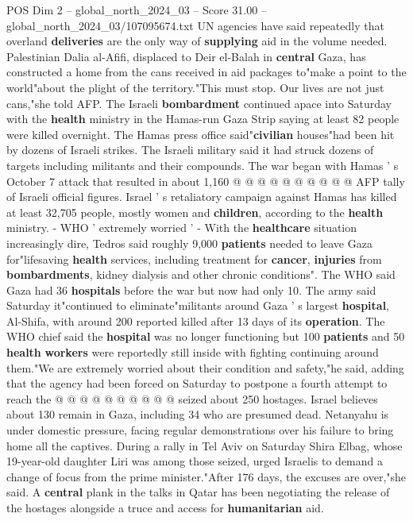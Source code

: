 \begin{textsample}{POS Dim 2 – global\_north\_2024\_03 – Score 31.00 – global\_north\_2024\_03/107095674.txt}
UN agencies have said repeatedly that overland \textbf{deliveries} are the only way of \textbf{supplying} aid in the volume needed.
Palestinian Dalia al-Afifi, displaced to Deir el-Balah in \textbf{central} Gaza, has constructed a home from the cans received in aid packages to"make a point to the world"about the plight of the territory."This must stop.
Our lives are not just cans,"she told AFP.
The Israeli \textbf{bombardment} continued apace into Saturday with the \textbf{health} ministry in the Hamas-run Gaza Strip saying at least 82 people were killed overnight.
The Hamas press office said"\textbf{civilian} houses"had been hit by dozens of Israeli strikes.
The Israeli military said it had struck dozens of targets including militants and their compounds.
The war began with Hamas ' s October 7 attack that resulted in about 1,160 @ @ @ @ @ @ @ @ @ @ AFP tally of Israeli official figures.
Israel ' s retaliatory campaign against Hamas has killed at least 32,705 people, mostly women and \textbf{children}, according to the \textbf{health} ministry. - WHO ' extremely worried ' - With the \textbf{healthcare} situation increasingly dire, Tedros said roughly 9,000 \textbf{patients} needed to leave Gaza for"lifesaving \textbf{health} services, including treatment for \textbf{cancer}, \textbf{injuries} from \textbf{bombardments}, kidney dialysis and other chronic conditions".
The WHO said Gaza had 36 \textbf{hospitals} before the war but now had only 10.
The army said Saturday it"continued to eliminate"militants around Gaza ' s largest \textbf{hospital}, Al-Shifa, with around 200 reported killed after 13 days of its \textbf{operation}.
The WHO chief said the \textbf{hospital} was no longer functioning but 100 \textbf{patients} and 50 \textbf{health} \textbf{workers} were reportedly still inside with fighting continuing around them."We are extremely worried about their condition and safety,"he said, adding that the agency had been forced on Saturday to postpone a fourth attempt to reach the @ @ @ @ @ @ @ @ @ @ seized about 250 hostages.
Israel believes about 130 remain in Gaza, including 34 who are presumed dead.
Netanyahu is under domestic pressure, facing regular demonstrations over his failure to bring home all the captives.
During a rally in Tel Aviv on Saturday Shira Elbag, whose 19-year-old daughter Liri was among those seized, urged Israelis to demand a change of focus from the prime minister."After 176 days, the excuses are over,"she said.
A \textbf{central} plank in the talks in Qatar has been negotiating the release of the hostages alongside a truce and access for \textbf{humanitarian} aid.

\end{textsample}
